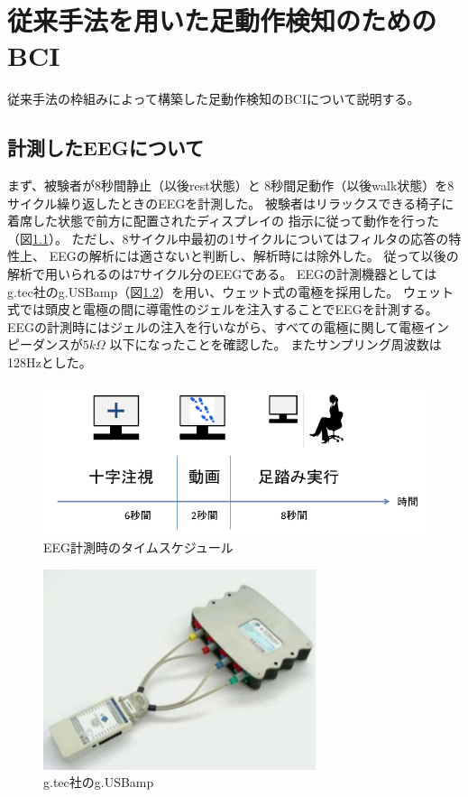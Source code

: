\chapter{従来手法を用いた足動作検知のためのBCI}
従来手法の枠組みによって構築した足動作検知のBCIについて説明する。
\section{計測したEEGについて}
まず、被験者が8秒間静止（以後rest状態）と
8秒間足動作（以後walk状態）を8サイクル繰り返したときのEEGを計測した。
被験者はリラックスできる椅子に着席した状態で前方に配置されたディスプレイの
指示に従って動作を行った（図\ref{fig:asibumi}）。
ただし、8サイクル中最初の1サイクルについてはフィルタの応答の特性上、
EEGの解析には適さないと判断し、解析時には除外した。
従って以後の解析で用いられるのは7サイクル分のEEGである。
EEGの計測機器としてはg.tec社のg.USBamp（図\ref{fig:usbamp}）を用い、ウェット式の電極を採用した。
ウェット式では頭皮と電極の間に導電性のジェルを注入することでEEGを計測する。
EEGの計測時にはジェルの注入を行いながら、すべての電極に関して電極インピーダンスが\(5k\Omega\)
以下になったことを確認した。
またサンプリング周波数は128Hzとした。
\begin{figure}
    \centering
    \includegraphics[width=13cm]{images/asibumi.png}
    \caption{EEG計測時のタイムスケジュール}
    \label{fig:asibumi}
\end{figure}
\begin{figure}
    \centering
    \includegraphics[width=8cm]{images/usbamp.png}
    \caption{g.tec社のg.USBamp}
    \label{fig:usbamp}
\end{figure}

